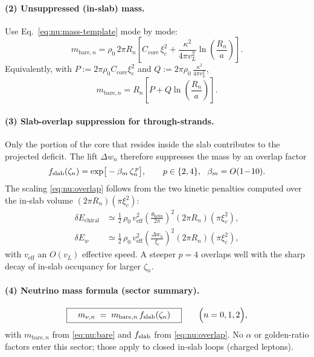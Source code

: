\paragraph{(2) Unsuppressed (in-slab) mass.}
Use Eq.~\eqref{eq:nu:mass-template} mode by mode:
\begin{equation}
\label{eq:nu:bare}
m_{\text{bare},n}
=\rho_0\,2\pi R_n
\left[C_{\mathrm{core}}\,\xi_c^2
+\frac{\kappa^2}{4\pi v_L^2}\ln\!\left(\frac{R_n}{a}\right)\right].
\end{equation}
Equivalently, with $P:=2\pi\rho_0 C_{\mathrm{core}}\xi_c^2$ and $Q:=2\pi\rho_0\,\frac{\kappa^2}{4\pi v_L^2}$,
\begin{equation}
m_{\text{bare},n}=R_n\left[P+Q\ln\!\left(\frac{R_n}{a}\right)\right].
\end{equation}

\paragraph{(3) Slab-overlap suppression for through-strands.}
Only the portion of the core that resides inside the slab contributes to the projected deficit. The lift $\Delta w_n$ therefore suppresses the mass by an overlap factor
\begin{equation}
\label{eq:nu:overlap}
f_{\rm slab}(\zeta_n)=\exp\!\big[-\beta_m\,\zeta_n^{\,p}\big],
\qquad p\in\{2,4\},\ \ \beta_m=O(1\!-\!10).
\end{equation}
The scaling \eqref{eq:nu:overlap} follows from the two kinetic penalties computed over the in-slab volume $(2\pi R_n)(\pi\xi_c^2)$:
\begin{align}
\delta E_{\mathrm{chiral}} &\simeq \tfrac{1}{2}\,\rho_0\,v_{\mathrm{eff}}^2
\left(\frac{\theta_{\mathrm{helix}}}{2\pi}\right)^{\!2} (2\pi R_n)(\pi\xi_c^2),\\
\delta E_{w} &\simeq \tfrac{1}{2}\,\rho_0\,v_{\mathrm{eff}}^2
\left(\frac{\Delta w_n}{\xi_c}\right)^{\!2} (2\pi R_n)(\pi\xi_c^2),
\end{align}
with $v_{\mathrm{eff}}$ an $O(v_L)$ effective speed. A steeper $p=4$ overlaps well with the sharp decay of in-slab occupancy for larger $\zeta_n$.

\paragraph{(4) Neutrino mass formula (sector summary).}
\begin{equation}
\label{eq:nu:fullmass}
\boxed{\quad m_{\nu,n}\;=\;m_{\text{bare},n}\,f_{\rm slab}(\zeta_n)\quad}
\qquad
\Big(n=0,1,2\Big),
\end{equation}
with $m_{\text{bare},n}$ from \eqref{eq:nu:bare} and $f_{\rm slab}$ from \eqref{eq:nu:overlap}. No $\alpha$ or golden-ratio factors enter this sector; those apply to closed in-slab loops (charged leptons).

